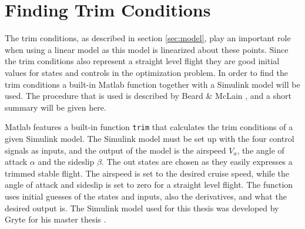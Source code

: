 \section{Finding Trim Conditions}

The trim conditions, as described in section \ref{sec:model}, play an important role when using a linear model as this model is linearized about these points. Since the trim conditions also represent a straight level flight they are good initial values for states and controls in the optimization problem. In order to find the trim conditions a built-in Matlab function together with a Simulink model will be used. The procedure that is used is described by Beard \& McLain \cite{uavBEARD}, and a short summary will be given here.

Matlab features a built-in function \texttt{trim} that calculates the trim conditions of a given Simulink model. The Simulink model must be set up with the four control signals as inputs, and the output of the model is the airspeed $V_a$, the angle of attack $\alpha$ and the sideslip $\beta$. The out states are chosen as they easily expresses a trimmed stable flight. The airspeed is set to the desired cruise speed, while the angle of attack and sideslip is set to zero for a straight level flight. The function uses initial guesses of the states and inputs, also the derivatives, and what the desired output is. The Simulink model used for this thesis was developed by Gryte for his master thesis \cite{GRYTE}.